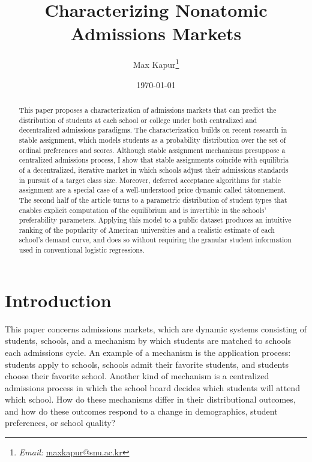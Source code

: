 \documentclass[12pt]{article}
\numberwithin{equation}{subsection}
\theoremstyle{definition}
\begin{document}
\title{Characterizing Nonatomic Admissions Markets}
\date{\today}
\author{Max Kapur\footnote{\emph{Email:} \href{mailto:maxkapur@snu.ac.kr}{maxkapur@snu.ac.kr}}}



\maketitle

\begin{abstract}
This paper proposes a characterization of admissions markets that can predict the distribution of students at each school or college under both centralized and decentralized admissions paradigms. The characterization builds on recent research in stable assignment, which models students as a probability distribution over the set of ordinal preferences and scores. Although stable assignment mechanisms presuppose a centralized admissions process, I show that stable assignments coincide with equilibria of a decentralized, iterative market in which schools adjust their admissions standards in pursuit of a target class size. Moreover, deferred acceptance algorithms for stable assignment are a special case of a well-understood price dynamic called t\^{a}tonnement. The second half of the article turns to a parametric distribution of student types that enables explicit computation of the equilibrium and is invertible in the schools' preferability parameters. Applying this model to a public dataset produces an intuitive ranking of the popularity of American universities and a realistic estimate of each school's demand curve, and does so without requiring the granular student information used in conventional logistic regressions.
\end{abstract}

\pagebreak
\tableofcontents

\pagebreak
\section{Introduction}
This paper concerns admissions markets, which are dynamic systems consisting of students, schools, and a mechanism by which students are matched to schools each admissions cycle. An example of a mechanism is the application process: students apply to schools, schools admit their favorite students, and students choose their favorite school. Another kind of mechanism is a centralized admissions process in which the school board decides which students will attend which school. How do these mechanisms differ in their distributional outcomes, and how do these outcomes respond to a change in demographics, student preferences, or school quality?
\end{document}
